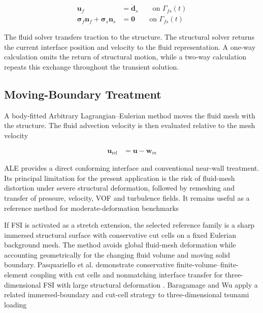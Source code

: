\begin{align}
\bm{u}_{f}
&=
\dot{\bm{d}}_{s}
\qquad
\text{on }\Gamma_{fs}(t)
\label{eq:res_str_fsi_kinematic_condition}
\\
\bm{\sigma}_{f}\bm{n}_{f}
+
\bm{\sigma}_{s}\bm{n}_{s}
&=
\bm{0}
\qquad
\text{on }\Gamma_{fs}(t)
\label{eq:res_str_fsi_dynamic_condition}
\end{align}

The fluid solver transfers traction to the structure. The structural solver returns the current interface position and velocity to the fluid representation. A one-way calculation omits the return of structural motion, while a two-way calculation repeats this exchange throughout the transient solution.

\subsection{Moving-Boundary Treatment}
\label{subsec:res_str_fsi_moving_boundary_treatment}

A body-fitted Arbitrary Lagrangian--Eulerian method moves the fluid mesh with the structure. The fluid advection velocity is then evaluated relative to the mesh velocity

\begin{align}
\bm{u}_{\mathrm{rel}}
&=
\bm{u}
-
\bm{w}_{m}
\label{eq:res_str_fsi_ale_relative_velocity}
\end{align}

ALE provides a direct conforming interface and conventional near-wall treatment. Its principal limitation for the present application is the risk of fluid-mesh distortion under severe structural deformation, followed by remeshing and transfer of pressure, velocity, VOF and turbulence fields. It remains useful as a reference method for moderate-deformation benchmarks \autocite{girfoglio2021}

If FSI is activated as a stretch extension, the selected reference
family is a sharp immersed structural surface with conservative cut
cells on a fixed Eulerian background mesh. The method avoids global
fluid-mesh deformation while accounting geometrically for the changing
fluid volume and moving solid boundary. Pasquariello et al.
demonstrate conservative finite-volume--finite-element coupling with
cut cells and nonmatching interface transfer for three-dimensional FSI
with large structural deformation \autocite{pasquariello2016}.
Baragamage and Wu apply a related immersed-boundary and cut-cell
strategy to three-dimensional tsunami loading
\autocite{baragamage2024fullycoupled}

